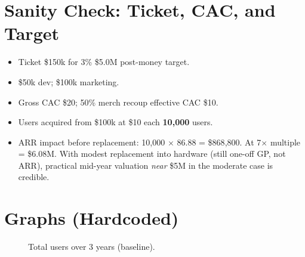 \documentclass[11pt]{article}
\begin{document}
\section{Sanity Check: Ticket, CAC, and Target}
\begin{itemize}
  \item Ticket \$150k for 3\% \Rightarrow \$5.0M post-money target.
  \item \$50k dev; \$100k marketing.
  \item Gross CAC \$20; 50\% merch recoup \Rightarrow effective CAC \$10.
  \item Users acquired from \$100k at \$10 each \Rightarrow \textbf{10{,}000} users.
  \item ARR impact before replacement: 10{,}000 $\times$ 86.88 = \$868{,}800. At 7$\times$ multiple = \$6.08M. With modest replacement into hardware (still one-off GP, not ARR), practical mid-year valuation \emph{near} \$5M in the moderate case is credible.
\end{itemize}

\section{Graphs (Hardcoded)}

\begin{figure}[h!]
\centering
{}
\caption{Total users over 3 years (baseline).}
\end{figure}
\end{document}
